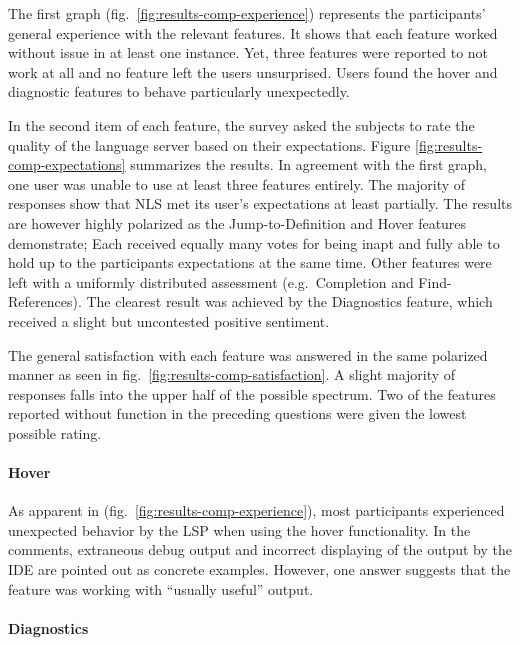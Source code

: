 \documentclass[
  a4paper,
  bibtex,
  english,
  nomenclature]{kthlatex/kththesis/kththesis}
\begin{document}
The first graph (fig.~\ref{fig:results-comp-experience}) represents the
participants' general experience with the relevant features. It shows
that each feature worked without issue in at least one instance. Yet,
three features were reported to not work at all and no feature left the
users unsurprised. Users found the hover and diagnostic features to
behave particularly unexpectedly.

In the second item of each feature, the survey asked the subjects to
rate the quality of the language server based on their expectations.
Figure \ref{fig:results-comp-expectations} summarizes the results. In
agreement with the first graph, one user was unable to use at least
three features entirely. The majority of responses show that NLS met its
user's expectations at least partially. The results are however highly
polarized as the Jump-to-Definition and Hover features demonstrate; Each
received equally many votes for being inapt and fully able to hold up to
the participants expectations at the same time. Other features were left
with a uniformly distributed assessment (e.g.~Completion and
Find-References). The clearest result was achieved by the Diagnostics
feature, which received a slight but uncontested positive sentiment.

The general satisfaction with each feature was answered in the same
polarized manner as seen in fig.~\ref{fig:results-comp-satisfaction}. A
slight majority of responses falls into the upper half of the possible
spectrum. Two of the features reported without function in the preceding
questions were given the lowest possible rating.

\hypertarget{sec:hover-res}{%
\paragraph{Hover}\label{sec:hover-res}}

As apparent in (fig.~\ref{fig:results-comp-experience}), most
participants experienced unexpected behavior by the LSP when using the
hover functionality. In the comments, extraneous debug output and
incorrect displaying of the output by the IDE are pointed out as
concrete examples. However, one answer suggests that the feature was
working with ``usually useful'' output.

\hypertarget{sec:diagnostics-res}{%
\paragraph{Diagnostics}\label{sec:diagnostics-res}}
\end{document}
